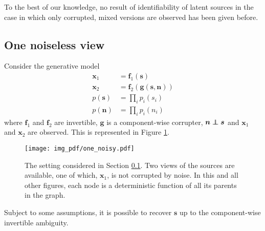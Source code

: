 To the best of our knowledge, no result of identifiability of latent sources in the case in which only corrupted, mixed versions are observed has been given before.



\subsection{One noiseless view}
\label{sec:onenoisless}
Consider the generative model
\begin{align}
\bm{x}_{1}&=\bm{f}_{1}(\bm{s}) \label{eq:sem2_1}\\
\bm{x}_{2}&=\bm{f}_{2}(\bm{g}(\bm{s}, \bm{n})) \label{eq:sem2_2} \\
p(\bm{s}) &= \prod_{i} p_i(s_i) \nonumber \\
p(\bm{n}) &= \prod_{i} p_i(n_i) \label{eq:indep}
\end{align}
where $\bm{f}_1$ and $\bm{f}_2$ are invertible, $\bm{g}$ is a component-wise corrupter, $\bm{n} \independent \bm{s}$ and $\bm{x}_1$ and $\bm{x}_2$ are observed.
This is represented in Figure \ref{fig:generalized_hsr_basic}.



\begin{figure}[t!]
    \centering
    \texttt{[image: img\_pdf/one\_noisy.pdf]}
    \caption{The setting considered in Section \ref{sec:onenoisless}. Two views of the sources are available, one of which, $\bm{x}_1$, is not corrupted by noise. In this and all other figures, each node is a deterministic function of all its parents in the graph.
        }
    \label{fig:generalized_hsr_basic}
\end{figure}

Subject to some assumptions, it is possible to recover $\bm{s}$ up to the
component-wise invertible ambiguity.

